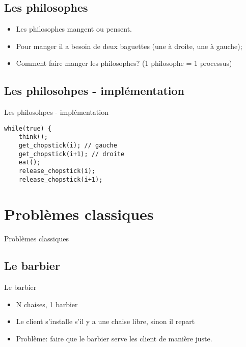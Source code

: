 \begin{frame}{\sectitle}
\begin{block}{\subsectitle}
\def\subsectitle{Les philosophes}
\subsection{\subsectitle}
\begin{itemize}
\item Les philosophes mangent ou pensent.
\item Pour manger il a besoin de deux baguettes (une à droite, une à gauche);
\item Comment faire manger les philosophes? (1 philosophe = 1 processus)
\end{itemize}
\end{block}
\end{frame}

\begin{frame}[containsverbatim]{\sectitle}
\def\subsectitle{Les philosohpes - implémentation}
\subsection{\subsectitle}
\begin{exampleblock}{\subsectitle}
\begin{verbatim}
while(true) {
    think();
    get_chopstick(i); // gauche
    get_chopstick(i+1); // droite
    eat();
    release_chopstick(i);
    release_chopstick(i+1);
\end{verbatim}
\end{exampleblock}
\end{frame}


\def\sectitle{Problèmes classiques}
\section{\sectitle}
\begin{frame}{\sectitle}
\def\subsectitle{Le barbier}
\subsection{\subsectitle}
\begin{block}{\subsectitle}
\begin{itemize}
\item N chaises, 1 barbier
\item Le client s'installe s'il y a une chaise libre, sinon il repart
\item Problème: faire que le barbier serve les client de manière juste.
\end{itemize}
\end{block}
\end{frame}


